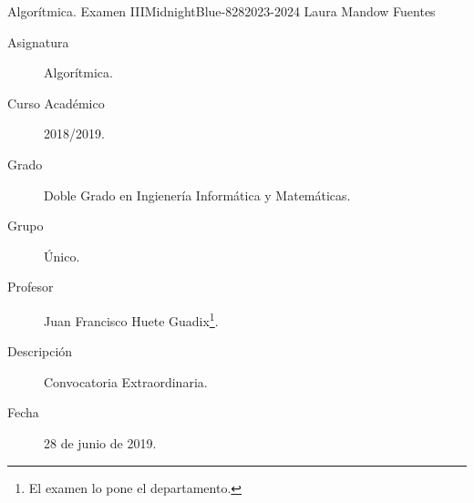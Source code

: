 \documentclass[12pt]{article}
\begin{document}

    
    
    {Algorítmica. Examen III}{MidnightBlue}{-8}{28}{2023-2024}
    {Laura Mandow Fuentes}

    \begin{description}
        \item[Asignatura] Algorítmica.
        \item[Curso Académico] 2018/2019.
        \item[Grado] Doble Grado en Ingienería Informática y Matemáticas.
        \item[Grupo] Único.
        \item[Profesor] Juan Francisco Huete Guadix\footnote{El examen lo pone el departamento.}.
        \item[Descripción] Convocatoria Extraordinaria. 
        \item[Fecha] 28 de junio de 2019.
    
    \end{description}
    \newpage
    
\end{document}
